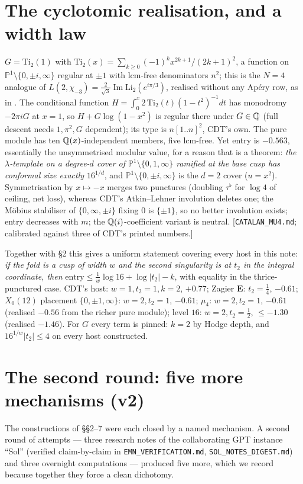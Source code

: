 \documentclass[11pt]{amsart}
\theoremstyle{remark}
\begin{document}
\section{The cyclotomic realisation, and a width law}
$G=\mathrm{Ti}_2(1)$ with $\mathrm{Ti}_2(x)=\sum_{k\ge0}(-1)^kx^{2k+1}/(2k+1)^2$, a function on $\mathbb P^1\setminus\{0,\pm i,\infty\}$ regular at $\pm1$ with lcm-free denominators $n^2$; this is the $N=4$ analogue of $L(2,\chi_{-3})=\tfrac2{\sqrt3}\operatorname{Im}\mathrm{Li}_2(e^{i\pi/3})$, realised without any Ap\'ery row, as in \cite[\S9]{CDTl2chi}. The conditional function $H=\int_0^x2\,\mathrm{Ti}_2(t)(1-t^2)^{-1}dt$ has monodromy $-2\pi iG$ at $x=1$, so $H+G\log(1-x^2)$ is regular there under $G\in\mathbb Q$ (full descent needs $1,\pi^2,G$ dependent); its type is $n[1..n]^2$, CDT's own. The pure module has ten $\mathbb Q(x)$-independent members, five lcm-free. Yet entry is $-0.563$, essentially the unsymmetrised modular value, for a reason that is a theorem: \emph{the $\lambda$-template on a degree-$d$ cover of $\mathbb P^1\setminus\{0,1,\infty\}$ ramified at the base cusp has conformal size exactly $16^{1/d}$}, and $\mathbb P^1\setminus\{0,\pm i,\infty\}$ is the $d=2$ cover ($u=x^2$). Symmetrisation by $x\mapsto-x$ merges two punctures (doubling $\tau^\flat$ for $\log4$ of ceiling, net loss), whereas CDT's Atkin--Lehner involution deletes one; the M\"obius stabiliser of $\{0,\infty,\pm i\}$ fixing $0$ is $\{\pm1\}$, so no better involution exists; entry decreases with $m$; the $\mathbb Q(i)$-coefficient variant is neutral. [\texttt{CATALAN\_MU4.md}; calibrated against three of CDT's printed numbers.]

Together with \S2 this gives a uniform statement covering every host in this note: \emph{if the fold is a cusp of width $w$ and the second singularity is at $t_2$ in the integral coordinate, then} $\mathrm{entry}\le\tfrac1w\log16+\log|t_2|-k$, with equality in the thrice-punctured case. CDT's host: $w=1,t_2=1,k=2$, $+0.77$; Zagier $\mathbf E$: $t_2=\tfrac14$, $-0.61$; $X_0(12)$ placement $\{0,\pm1,\infty\}$: $w=2,t_2=1$, $-0.61$; $\mu_4$: $w=2,t_2=1$, $-0.61$ (realised $-0.56$ from the richer pure module); level $16$: $w=2,t_2=\tfrac12$, $\le-1.30$ (realised $-1.46$). For $G$ every term is pinned: $k=2$ by Hodge depth, and $16^{1/w}|t_2|\le4$ on every host constructed.

\section{The second round: five more mechanisms (v2)}
The constructions of \S\S2--7 were each closed by a named mechanism. A second round of attempts --- three research notes of the collaborating GPT instance ``Sol'' (verified claim-by-claim in \texttt{EMN\_VERIFICATION.md}, \texttt{SOL\_NOTES\_DIGEST.md}) and three overnight computations --- produced five more, which we record because together they force a clean dichotomy.
\end{document}
